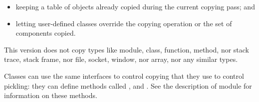 \begin{itemize}

\item
keeping a table of objects already copied during the current
copying pass; and

\item
letting user-defined classes override the copying operation or the
set of components copied.

\end{itemize}

This version does not copy types like module, class, function, method,
nor stack trace, stack frame, nor file, socket, window, nor array, nor
any similar types.

Classes can use the same interfaces to control copying that they use
to control pickling: they can define methods called
,  and
.  See the description of module 
for information on these methods.

